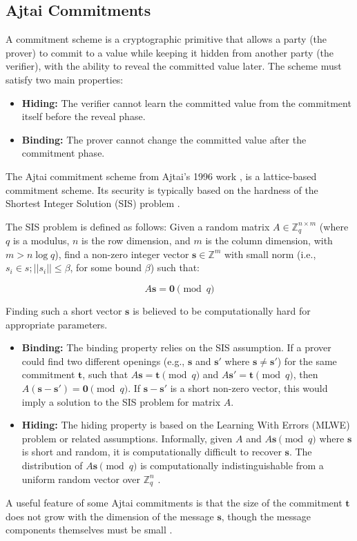 \subsection{Ajtai Commitments}

A commitment scheme is a cryptographic primitive that allows a party (the
prover) to commit to a value while keeping it hidden from another party (the
verifier), with the ability to reveal the committed value later. The scheme
must satisfy two main properties:
\begin{itemize}
    \item \textbf{Hiding:} The verifier cannot learn the committed value from
		the commitment itself before the reveal phase.
    \item \textbf{Binding:} The prover cannot change the committed value after
		the commitment phase.
\end{itemize}

The Ajtai commitment scheme from Ajtai's 1996 work \cite{AjtaiLattices}, is a
lattice-based commitment scheme. Its security is typically based on the
hardness of the Shortest Integer Solution (SIS) problem \cite{AjtaiLattices, LatticeTutorial}.

The SIS problem is defined as follows: Given a random matrix
$A \in \mathbb{Z}_q^{n \times m}$ (where $q$ is a modulus, $n$ is the row
dimension, and $m$ is the column dimension, with $m > n \log q$), find a
non-zero integer vector $\mathbf{s} \in \mathbb{Z}^m$ with small norm (i.e.,
$s_i \in s; ||s_i|| \leq \beta$, for some bound $\beta$) such that:

\[
	A\mathbf{s} = \mathbf{0} \pmod{q}
\]

Finding such a short vector $\mathbf{s}$ is believed to be computationally
hard for appropriate parameters.

\begin{itemize}
    \item \textbf{Binding:} The binding property relies on the SIS assumption.
		If a prover could find two different openings (e.g., $\mathbf{s}$ and
		$\mathbf{s}'$ where $\mathbf{s} \neq \mathbf{s}'$) for the same
		commitment $\mathbf{t}$, such that $A\mathbf{s} = \mathbf{t} \pmod{q}$
		and $A\mathbf{s}' = \mathbf{t} \pmod{q}$, then $A(\mathbf{s} -
		\mathbf{s}') = \mathbf{0} \pmod{q}$. If $\mathbf{s} - \mathbf{s}'$ is
		a short non-zero vector, this would imply a solution to the SIS
		problem for matrix $A$.
    \item \textbf{Hiding:} The hiding property is based on the Learning With
		Errors (MLWE) problem or related assumptions. Informally, given $A$ and
		$A\mathbf{s} \pmod{q}$ where $\mathbf{s}$ is short and random, it is
		computationally difficult to recover $\mathbf{s}$. The distribution of
		$A\mathbf{s} \pmod{q}$ is computationally indistinguishable from a
		uniform random vector over $\mathbb{Z}_q^n$ \cite{LatticesInZKP}.
\end{itemize}

A useful feature of some Ajtai commitments is that the size of the
commitment $\mathbf{t}$ does not grow with the dimension of the
message $\mathbf{s}$, though the message components themselves must be
small \cite{LatticesInZKP}.
